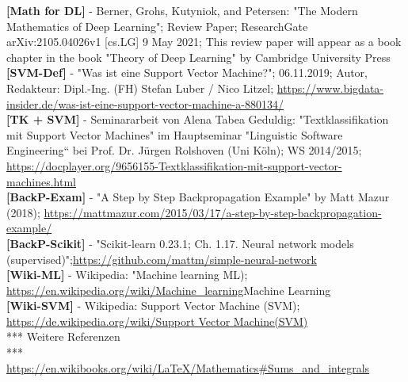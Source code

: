 \documentclass[12pt]{article}
\begin{document}
\textbf{[Math for DL]} - Berner, Grohs, Kutyniok, and Petersen: "The Modern Mathematics of Deep Learning"; Review Paper; ResearchGate arXiv:2105.04026v1 [cs.LG] 9 May 2021; This review paper will appear as a book chapter in the book "Theory of Deep Learning" by Cambridge University Press\\

\textbf{[SVM-Def]} - "Was ist eine Support Vector Machine?"; 06.11.2019; Autor, Redakteur: Dipl.-Ing. (FH) Stefan Luber / Nico Litzel; \url{https://www.bigdata-insider.de/was-ist-eine-support-vector-machine-a-880134/}\\

\textbf{[TK + SVM]} - Seminararbeit von Alena Tabea Geduldig: "Textklassifikation mit Support Vector Machines" im  Hauptseminar "Linguistic Software Engineering“ bei Prof. Dr. Jürgen Rolshoven (Uni Köln); WS 2014/2015; \url{https://docplayer.org/9656155-Textklassifikation-mit-support-vector-machines.html}\\

\textbf{[BackP-Exam]} - "A Step by Step Backpropagation Example" by Matt Mazur (2018); \url{https://mattmazur.com/2015/03/17/a-step-by-step-backpropagation-example/}\\

\textbf{[BackP-Scikit]} - "Scikit-learn 0.23.1; Ch. 1.17. Neural network models (supervised)";\url{https://github.com/mattm/simple-neural-network}\\

\textbf{[Wiki-ML]} - Wikipedia: "Machine learning ML); \url{https://en.wikipedia.org/wiki/Machine_learning}{Machine Learning}\\

\textbf{[Wiki-SVM]} - Wikipedia: Support Vector Machine (SVM); \url{https://de.wikipedia.org/wiki/Support Vector Machine(SVM)} \\

*** Weitere Referenzen \\
***\\


\url{https://en.wikibooks.org/wiki/LaTeX/Mathematics#Sums_and_integrals}
\end{document}
